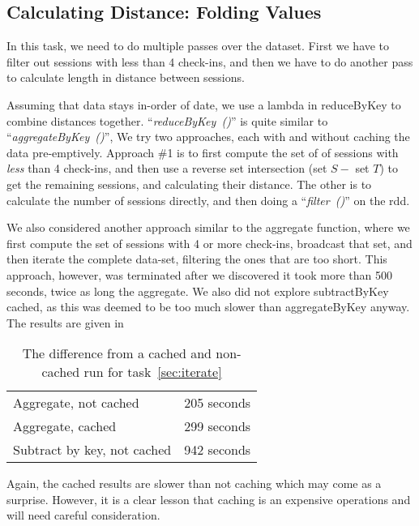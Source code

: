 \newpage
{}


\subsection{Calculating Distance: Folding Values}\label{sec:distanceCalc}
In this task, we need to do multiple passes over the dataset. First
we have to filter out sessions with less than 4 check-ins, and then we have to do another pass to calculate length in distance between sessions. 

Assuming that data stays in-order of date, we use a lambda in reduceByKey to combine distances together. ``\textit{reduceByKey~()}'' is quite similar to ``\textit{aggregateByKey~()}'', We try two approaches, each with and without caching the data pre-emptively. Approach \#1 is to first compute the set of of sessions with \textit{less} than 4 check-ins, and then use a reverse set intersection (set $S - $ set $T$) to get the remaining sessions, and calculating their distance. The other is to calculate the number of sessions directly, and then doing a ``\textit{filter~()}'' on the rdd.

We also considered another approach similar to the aggregate function, where we first compute the set of sessions with 4 or more check-ins, broadcast that set, and then iterate the complete data-set, filtering the ones that are too short. This approach, however, was terminated after we discovered it took more than 500 seconds, twice as long the aggregate.
We also did not explore subtractByKey cached, as this was deemed to be too much slower than aggregateByKey anyway. The results are given in~

\begin{table}
\centering
\begin{tabular}{p{}|p{}}
        Aggregate, not cached & 205 seconds \\
        Aggregate, cached & 299 seconds \\
        Subtract by key, not cached & 942 seconds \\
    \end{tabular}
    \caption{The difference from a cached and non-cached run for task~\ref{sec:iterate}}
\label{tab:aggreagateOrSubtract}
\end{table}

Again, the cached results are slower than not caching which may come as a surprise. However, it is a clear lesson that caching is an expensive operations and will need careful consideration.


